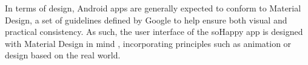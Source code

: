 In terms of design, Android apps are generally expected to conform to Material Design, a set of guidelines defined by Google to help ensure both visual and practical consistency. As such, the user interface of the soHappy app is designed with Material Design in mind \cite{material_design}, incorporating principles such as animation or design based on the real world.
